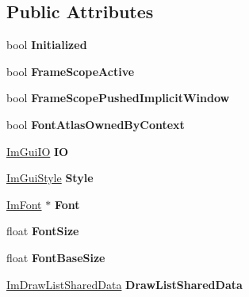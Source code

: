 \subsection*{Public Attributes}
\begin{DoxyCompactItemize}
\item 
\mbox{\label{structImGuiContext_a71b32432f5c4658b4772b293640a66c0}} 
bool {\bfseries Initialized}
\item 
\mbox{\label{structImGuiContext_aa79e158ac0aeaf53cc16e9277fd4431b}} 
bool {\bfseries Frame\+Scope\+Active}
\item 
\mbox{\label{structImGuiContext_ab9a99ebcc5ad0b04d57893242d38e0c3}} 
bool {\bfseries Frame\+Scope\+Pushed\+Implicit\+Window}
\item 
\mbox{\label{structImGuiContext_a06996a09451ec85ef2a34c4de4280441}} 
bool {\bfseries Font\+Atlas\+Owned\+By\+Context}
\item 
\mbox{\label{structImGuiContext_add4fdcc8c6a437d8f8e7c837418be83c}} 
\hyperlink{structImGuiIO}{Im\+Gui\+IO} {\bfseries IO}
\item 
\mbox{\label{structImGuiContext_a2e682502e1a3d2c399171dd3c4fc969d}} 
\hyperlink{structImGuiStyle}{Im\+Gui\+Style} {\bfseries Style}
\item 
\mbox{\label{structImGuiContext_aec64e774018a7d74515baeb9e06fb4e3}} 
\hyperlink{structImFont}{Im\+Font} $\ast$ {\bfseries Font}
\item 
\mbox{\label{structImGuiContext_af4022d1866887cdc400131fc6a65b200}} 
float {\bfseries Font\+Size}
\item 
\mbox{\label{structImGuiContext_a0fcbda57d25b80111283ed7305ee3ee8}} 
float {\bfseries Font\+Base\+Size}
\item 
\mbox{\label{structImGuiContext_a71045e6879ff2d074836273ba00674e6}} 
\hyperlink{structImDrawListSharedData}{Im\+Draw\+List\+Shared\+Data} {\bfseries Draw\+List\+Shared\+Data}
\item 

\end{DoxyCompactItemize}
